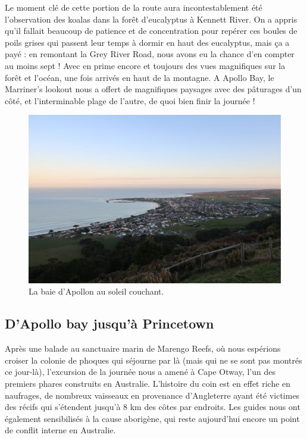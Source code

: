 Le moment clé de cette portion de la route aura incontestablement été
l'observation des koalas dans la forêt d'eucalyptus à Kennett River. On
a appris qu'il fallait beaucoup de patience et de concentration pour
repérer ces boules de poils grises qui passent leur temps à dormir en
haut des eucalyptus, mais ça a payé : en remontant la Grey River Road,
nous avons eu la chance d'en compter au moins sept ! Avec en prime
encore et toujours des vues magnifiques sur la forêt et l'océan, une
fois arrivés en haut de la montagne. A Apollo Bay, le Marriner's lookout
nous a offert de magnifiques paysages avec des pâturages d'un côté, et
l'interminable plage de l'autre, de quoi bien finir la journée !

\begin{figure}
\centering
\includegraphics{images/20180731_apollobay.JPG}
\caption{La baie d'Apollon au soleil couchant.}
\end{figure}

\hypertarget{dapollo-bay-jusquuxe0-princetown}{%
\subsection{D'Apollo bay jusqu'à
Princetown}\label{dapollo-bay-jusquuxe0-princetown}}

Après une balade au sanctuaire marin de Marengo Reefs, où nous espérions
croiser la colonie de phoques qui séjourne par là (mais qui ne se sont
pas montrés ce jour-là), l'excursion de la journée nous a amené à Cape
Otway, l'un des premiers phares construits en Australie. L'histoire du
coin est en effet riche en naufrages, de nombreux vaisseaux en
provenance d'Angleterre ayant été victimes des récifs qui s'étendent
jusqu'à 8 km des côtes par endroits. Les guides nous ont également
sensibilisés à la cause aborigène, qui reste aujourd'hui encore un point
de conflit interne en Australie.

